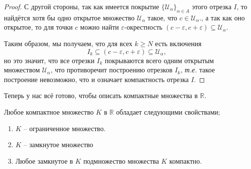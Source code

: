 \begin{proof}
С другой стороны, так как имеется покрытие $\{\mathscr{U}_\alpha\}_{\alpha \in A}$ этого отрезка $I$, то найдётся хотя бы одно открытое множество $\mathscr{U}_\alpha$ такое, что $c \in \mathscr{U}_\alpha.$, а так как оно открытое, то для точки $c$ можно найти $\varepsilon$-окрестность $(c-\varepsilon, c+ \varepsilon) \subseteq \mathscr{U}_\alpha.$ 

Таким образом, мы получаем, что для всех $k \ge N$ есть включения
\[
 I_k \subseteq (c-\varepsilon, c+ \varepsilon) \subseteq \mathscr{U}_\alpha,
\]
но это значит, что все отрезки $I_k$ покрываются всего одним открытым множеством $\mathscr{U}_\alpha$, что противоречит построению отрезков $I_k$, \textit{т.е.} такое построение невозможно, что и означает компактность отрезка $I.$
\end{proof}

Теперь у нас всё готово, чтобы описать компактные множества в $\mathbb{R}$.

\begin{theorem}\label{properties_of_compact_in_R}
Любое компактное множество $K$ в $\mathbb{R}$ обладает следующими свойствами;
  \begin{enumerate}
      \item $K$ -- ограниченное множество.
      \item $K$ -- замкнутое множество
      \item Любое замкнутое в $K$ подмножество множества $K$ компактно.
  \end{enumerate} 
\end{theorem}


